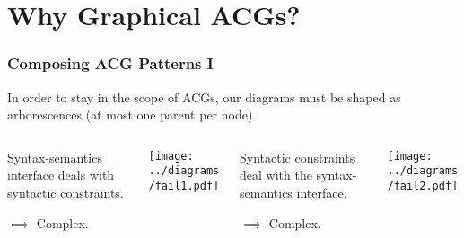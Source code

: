 \documentclass{beamer}
\begin{document}
\section{Why Graphical ACGs?}

\begin{frame}
  \frametitle{Composing ACG Patterns I}

  In order to stay in the scope of ACGs, our diagrams must be shaped as
  arborescences (at most one parent per node).

  \begin{columns}[c]
    \begin{column}{0.25\textwidth}
      {\small Syntax-semantics interface deals with syntactic
        constraints.}

      $\implies$ Complex.
    \end{column}
    \begin{column}{0.25\textwidth}
      \begin{center}
        \texttt{[image: ../diagrams/fail1.pdf]}
      \end{center}
    \end{column}
    \begin{column}{0.25\textwidth}
      {\small Syntactic constraints deal with the syntax-semantics
        interface.}

      $\implies$ Complex.
    \end{column}
    \begin{column}{0.25\textwidth}
      \begin{center}
        \texttt{[image: ../diagrams/fail2.pdf]}
      \end{center}
    \end{column}
  \end{columns}
\end{frame}
\end{document}
